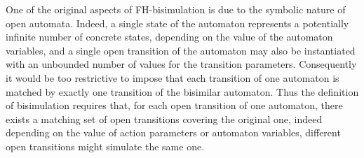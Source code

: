 \documentclass{elsarticle}
\begin{document}
One of the original aspects of FH-bisimulation is due to the symbolic nature of open automata. Indeed, a single state of the automaton represents a potentially infinite number of concrete states, depending on the value of the automaton variables, and a single open transition of the automaton may also be instantiated with an unbounded number of values for the transition parameters. Consequently it would be too restrictive to impose that each transition of one automaton is matched by exactly one transition of the bisimilar automaton. Thus the definition of bisimulation requires that, for each open transition of one automaton, there exists a matching  set of open transitions covering the original one, indeed depending on the value of action parameters or automaton variables, different open transitions might simulate the same one.
\end{document}
